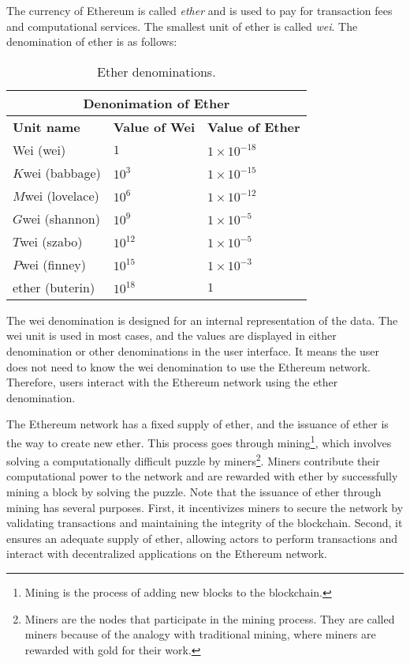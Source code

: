 The currency of Ethereum is called \textit{ether} and is used to pay for transaction fees and computational services. The smallest unit
of ether is called \textit{wei}. The denomination of ether is as follows:




\begin{table}[H]
  \centering
  \begin{tabular}{|l|l|l|}
      \hline
      \multicolumn{3}{|c|}{\textbf{Denonimation of Ether}}                 \\ \hline
      \textbf{Unit name} & \textbf{Value of Wei} & \textbf{Value of Ether} \\ \hline
      Wei (wei)          & $1$                   & $1\times10^{-18}$       \\ \hline
      $K$wei (babbage)   & $10^{3}$              & $1\times10^{-15}$       \\ \hline
      $M$wei (lovelace)  & $10^{6}$              & $1\times10^{-12}$       \\ \hline
      $G$wei (shannon)   & $10^{9}$              & $1\times10^{-5}$        \\ \hline
      $T$wei (szabo)     & $10^{12}$             & $1\times10^{-5}$        \\ \hline
      $P$wei (finney)    & $10^{15}$             & $1\times10^{-3}$        \\ \hline
      ether (buterin)    & $10^{18}$             & $1$                     \\ \hline
  \end{tabular}
  \caption{Ether denominations.}
  \label{tab:ether_denominations}
\end{table}




The wei denomination is designed for an internal representation of the data. The wei unit is used in most cases, and the values
are displayed in either denomination or other denominations in the user interface. It means the user does not need to
know the wei denomination to use the Ethereum network. Therefore, users interact with the Ethereum network using the ether denomination.


The Ethereum network has a fixed supply of ether, and the issuance of ether
is the way to create new ether. This process goes through mining\footnote{Mining is the process of adding new blocks to the blockchain.},
which involves solving a computationally difficult puzzle by miners\footnote{Miners are the nodes that participate in the mining process. They are
called miners because of the analogy with traditional mining, where miners are rewarded with gold for their work.}.
Miners contribute their computational power to the network and are rewarded with ether by successfully mining a block by solving the puzzle.
Note that the issuance of ether through mining has several purposes. First, it incentivizes miners to secure the network by validating transactions
and maintaining the integrity of the blockchain. Second, it ensures an adequate supply of ether, allowing actors to perform transactions and interact
with decentralized applications on the Ethereum network.




